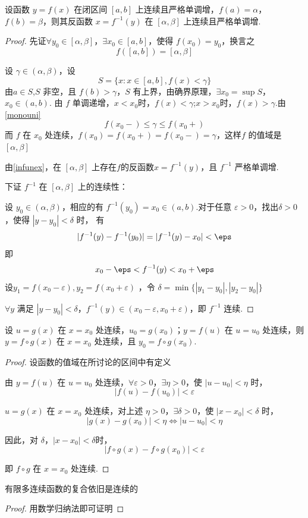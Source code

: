 \begin{proposition}
	设函数 $y = f(x)$ 在闭区间 $[a, b]$ 上连续且严格单调增，$f(a) = \alpha$，$f(b) = \beta$，则其反函数 $x = f^{-1}(y)$ 在 $[\alpha, \beta]$ 上连续且严格单调增.
	
	
\end{proposition}
\begin{proof}
	先证$\forall y_0 \in [\alpha, \beta]$，$\exists x_0 \in [a, b]$，使得 $f(x_0) = y_0$，换言之$$f([a, b]) = [\alpha, \beta]$$
	
	设 $\gamma \in (\alpha, \beta)$，设
	$$S = \{x : x \in [a, b], f(x) < \gamma
	\}$$
	由$a\in S$,$S$ 非空，且 $f(b) > \gamma$，$S$ 有上界，由确界原理，$\exists x_0 = \sup S$，$x_0 \in (a, b)$.
	由 $f$ 单调递增，$x<x_0$时，$f(x)<\gamma$;$x>x_0$时，$f(x)>\gamma$.由\ref{monouni}
	$$f(x_0-) \leqslant \gamma \leqslant f(x_0+)$$
	而 $f$ 在 $x_0$ 处连续，$f(x_0) =f(x_0+)=f(x_0-)= \gamma$，这样$f$ 的值域是 $[\alpha, \beta]$
	
	由\ref{infunex}，在 $[\alpha, \beta]$ 上存在$f$的反函数$x=f^{-1}(y)$，且 $f^{-1}$ 严格单调增.
	
	下证 $f^{-1}$ 在 $[\alpha, \beta]$ 上的连续性：
	
	设 $y_0 \in (\alpha, \beta)$，相应的有 $f^{-1}(y_0) = x_0 \in (a, b)$.对于任意 $\varepsilon > 0$，找出$\delta > 0$，使得 $|y - y_0| < \delta$ 时，
	有 
	$$|f^{-1}(y)-f^{-1}(y_0)|=|f^{-1}(y)-x_0|<\eps$$
	即$$x_0-\eps<f^{-1}(y)<x_0+\eps$$
	设$y_1 = f(x_0 - \varepsilon),y_2 = f(x_0 + \varepsilon)$
	，令 $\delta = \min\{|y_1 - y_0|, |y_2 - y_0|\}$
	
	$\forall y$ 满足 $|y - y_0| < \delta$，$f^{-1}(y) \in (x_0 - \varepsilon, x_0 + \varepsilon)$，即 $f^{-1}$ 连续.
	
\end{proof}
\begin{proposition}
	设 $u = g(x)$ 在 $x = x_0$ 处连续，$u_0 = g(x_0)$；$y = f(u)$ 在 $u = u_0$ 处连续，则 $y = f \circ g(x)$ 在 $x = x_0$ 处连续，且 $y_0 = f \circ g(x_0)$.
	
	
\end{proposition}
\begin{proof}
	设函数的值域在所讨论的区间中有定义
	
	由 $y = f(u)$ 在 $u = u_0$ 处连续，$\forall \varepsilon > 0$，$\exists \eta > 0$，使 $|u - u_0| < \eta$ 时，
	\[ |f(u) - f(u_0)| < \varepsilon \]
	
	$u = g(x)$ 在 $x = x_0$ 处连续，对上述 $\eta > 0$，$\exists \delta > 0$，使 $|x - x_0| < \delta$ 时，
	\[ |g(x) - g(x_0)| < \eta \Leftrightarrow|u - u_0| < \eta \]
	
	因此，对 $\delta$，$|x-x_0|<\delta$时，
	\[ |f \circ g(x) - f \circ g(x_0)| < \varepsilon \]
	
	即 $f \circ g$ 在 $x = x_0$ 处连续.
\end{proof}
\begin{corollary}
	有限多连续函数的复合依旧是连续的
\end{corollary}
\begin{proof}
	用数学归纳法即可证明
\end{proof}
